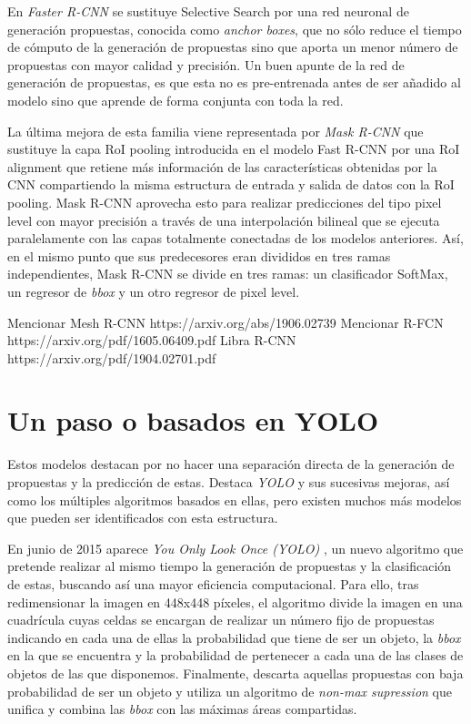 En \emph{Faster R-CNN} \cite{2015arXiv150601497R} se sustituye Selective Search por una red neuronal de generación propuestas, conocida como \emph{anchor boxes}, que no sólo reduce el tiempo de cómputo de la generación de propuestas sino que aporta un menor número de propuestas con mayor calidad y precisión. Un buen apunte de la red de generación de propuestas, es que esta no es pre-entrenada antes de ser añadido al modelo sino que aprende de forma conjunta con toda la red.\newline

La última mejora de esta familia viene representada por \emph{Mask R-CNN} \cite{2017arXiv170306870H} que sustituye la capa RoI pooling introducida en el modelo Fast R-CNN por una RoI alignment que retiene más información de las características obtenidas por la CNN compartiendo la misma estructura de entrada y salida de datos con la RoI pooling. Mask R-CNN aprovecha esto para realizar predicciones del tipo pixel level con mayor precisión a través de una interpolación bilineal que se ejecuta paralelamente con las capas totalmente conectadas de los modelos anteriores. Así, en el mismo punto que sus predecesores eran divididos en tres ramas independientes, Mask R-CNN se divide en tres ramas: un clasificador SoftMax, un regresor de \emph{bbox} y un otro regresor de pixel level.\newline

Mencionar Mesh R-CNN
https://arxiv.org/abs/1906.02739\newline
Mencionar R-FCN
https://arxiv.org/pdf/1605.06409.pdf\newline
Libra R-CNN
https://arxiv.org/pdf/1904.02701.pdf
\section{Un paso o basados en YOLO}
Estos modelos destacan por no hacer una separación directa de la generación de propuestas y la predicción de estas. Destaca \emph{YOLO} y sus sucesivas mejoras, así como los múltiples algoritmos basados en ellas, pero existen muchos más modelos que pueden ser identificados con esta estructura.\newline

En junio de 2015 aparece \emph{You Only Look Once (YOLO)} \cite{2015arXiv150602640R}, un nuevo algoritmo que pretende realizar al mismo tiempo la generación de propuestas y la clasificación de estas, buscando así una mayor eficiencia computacional. Para ello, tras redimensionar la imagen en 448x448 píxeles, el algoritmo divide la imagen en una cuadrícula cuyas celdas se encargan de realizar un número fijo de propuestas indicando en cada una de ellas la probabilidad que tiene de ser un objeto, la \emph{bbox} en la que se encuentra y la probabilidad de pertenecer a cada una de las clases de objetos de las que disponemos. Finalmente, descarta aquellas propuestas con baja probabilidad de ser un objeto y utiliza un algoritmo de \emph{non-max supression} \cite{2017arXiv170404503B} que unifica y combina las \emph{bbox} con las máximas áreas compartidas.\newline

